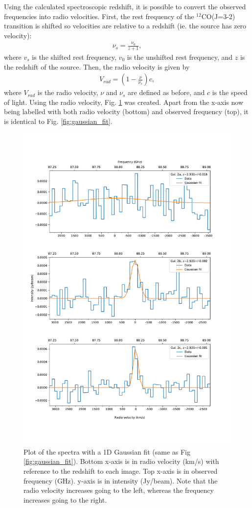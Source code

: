 \documentclass[11pt]{article}
\begin{document}
Using the calculated spectroscopic redshift, it is possible to convert the observed frequencies into radio velocities. First, the rest frequency of the $^{12}$CO(J=3-2) transition is shifted so velocities are relative to a redshift (ie. the source has zero velocity):
\begin{align}\label{eqn:restfreq_shift}
	\nu_s = \frac{\nu_0}{z+1},
\end{align}
where $v_s$ is the shifted rest frequency, $v_0$ is the unshifted rest frequency, and $z$ is the redshift of the source. Then, the radio velocity is given by 
\begin{align}\label{eqn:radio_vel}
	V_{rad} = (1 - \frac{\nu}{\nu_s})c,
\end{align}
where $V_{rad}$ is the radio velocity, $\nu$ and $\nu_s$ are defined as before, and $c$ is the speed of light. Using the radio velocity, Fig. \ref{fig:velocity_axis} was created. Apart from the x-axis now being labelled with both radio velocity (bottom) and observed frequency (top), it is identical to Fig. \ref{fig:gaussian_fit}.

\begin{figure}[!htbp]
    \centering
    \includegraphics[width=0.8\linewidth]{../figs/velocity_axis_plot.pdf}
	\caption{Plot of the spectra with a 1D Gaussian fit (same as Fig \ref{fig:gaussian_fit}). Bottom x-axis is in radio velocity (km/s) with reference to the redshift to each image. Top x-axis is in observed frequency (GHz). y-axis is in intensity (Jy/beam). Note that the radio velocity increases going to the left, whereas the frequency increases going to the right.}
	\label{fig:velocity_axis}
\end{figure}
\end{document}
